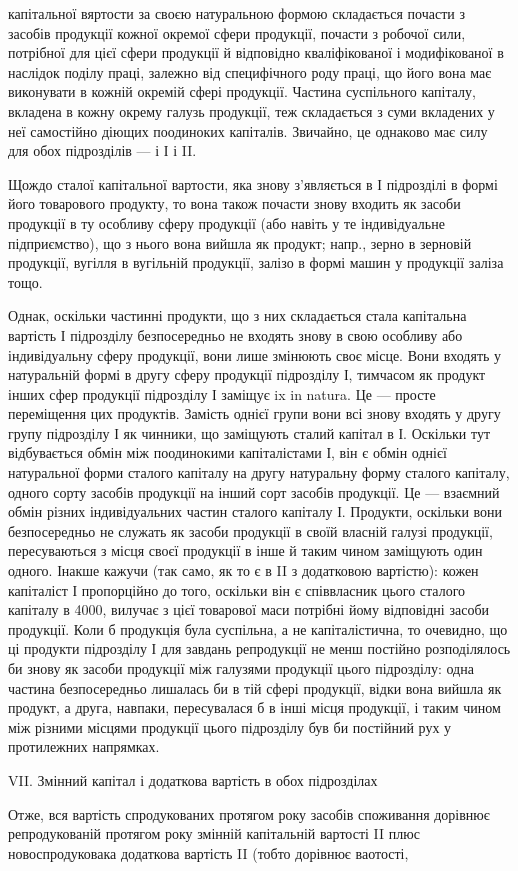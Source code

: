 \parcont{}  %
капітальної вяртости за своєю натуральною формою складається почасти
з засобів продукції кожної окремої сфери продукції, почасти з робочої
сили, потрібної для цієї сфери продукції й відповідно кваліфікованої і
модифікованої в наслідок поділу праці, залежно від специфічного роду
праці, що його вона має виконувати в кожній окремій сфері продукції.
Частина суспільного капіталу, вкладена в кожну окрему галузь продукції,
теж складається з суми вкладених у неї самостійно діющих поодиноких
капіталів. Звичайно, це однаково має силу для обох підрозділів —
і І і II.

Щождо сталої капітальної вартости, яка знову з’являється в І підрозділі
в формі його товарового продукту, то вона також почасти знову
входить як засоби продукції в ту особливу сферу продукції (або навіть у те
індивідуальне підприємство), що з нього вона вийшла як продукт; напр.,
зерно в зерновій продукції, вугілля в вугільній продукції, залізо в формі
машин у продукції заліза тощо.

Однак, оскільки частинні продукти, що з них складається стала капітальна
вартість І підрозділу безпосередньо не входять знову в свою
особливу або індивідуальну сферу продукції, вони лише змінюють своє
місце. Вони входять у натуральній формі в другу сферу продукції підрозділу
І, тимчасом як продукт інших сфер продукції підрозділу І заміщує
ix in natura. Це — просте переміщення цих продуктів. Замість однієї
групи вони всі знову входять у другу групу підрозділу І як чинники,
що заміщують сталий капітал в І. Оскільки тут відбувається обмін між
поодинокими капіталістами І, він є обмін однієї натуральної форми сталого
капіталу на другу натуральну форму сталого капіталу, одного сорту засобів
продукції на інший сорт засобів продукції. Це — взаємний обмін
різних індивідуальних частин сталого капіталу І. Продукти, оскільки вони
безпосередньо не служать як засоби продукції в своїй власній галузі продукції,
пересуваються з місця своєї продукції в інше й таким чином
заміщують один одного. Інакше кажучи (так само, як то є в II з додатковою
вартістю): кожен капіталіст І пропорційно до того, оскільки він є
співвласник цього сталого капіталу в 4000, вилучає з цієї товарової маси
потрібні йому відповідні засоби продукції. Коли б продукція була суспільна,
а не капіталістична, то очевидно, що ці продукти підрозділу І
для завдань репродукції не менш постійно розподілялось би знову як
засоби продукції між галузями продукції цього підрозділу: одна частина
безпосередньо лишалась би в тій сфері продукції, відки вона вийшла як
продукт, а друга, навпаки, пересувалася б в інші місця продукції, і таким
чином між різними місцями продукції цього підрозділу був би постійний
рух у протилежних напрямках.

VII. Змінний капітал і додаткова вартість в обох підрозділах

Отже, вся вартість спродукованих протягом року засобів споживання
дорівнює репродукованій протягом року змінній капітальній вартості II
плюс новоспродуковака додаткова вартість II (тобто дорівнює ваотості,
\parbreak{}  %

